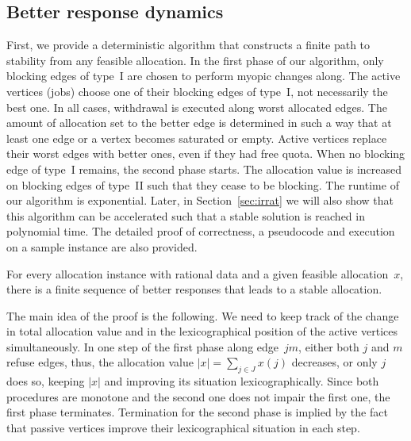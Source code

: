 \documentclass{llncs}
\begin{document}
\subsection{Better response dynamics}



First, we provide a deterministic algorithm that constructs a finite path to stability from any feasible allocation. In the first phase of our algorithm, only blocking edges of type~I are chosen to perform myopic changes along. The active vertices (jobs) choose one of their blocking edges of type~I, not necessarily the best one. In all cases, withdrawal is executed along worst allocated edges. The amount of allocation set to the better edge is determined in such a way that at least one edge or a vertex becomes saturated or empty. Active vertices replace their worst edges with better ones, even if they had free quota. When no blocking edge of type~I remains, the second phase starts. The allocation value is increased on blocking edges of type~II such that they cease to be blocking. The runtime of our algorithm is exponential. Later, in Section~\ref{sec:irrat} we will also show that this algorithm can be accelerated such that a stable solution is reached in polynomial time. The detailed proof of correctness, a pseudocode and execution on a sample instance are also provided.

\begin{theorem}
\label{th:better_rat}
For every allocation instance with rational data and a given feasible allocation~$x$, there is a finite sequence of better responses that leads to a stable allocation.
\end{theorem}

The main idea of the proof is the following. We need to keep track of the change in total allocation value and in the lexicographical position of the active vertices simultaneously. In one step of the first phase along edge~$jm$, either both $j$ and $m$ refuse edges, thus, the allocation value $|x| = \sum_{j \in J} x(j)$ decreases, or only $j$ does so, keeping $|x|$ and improving its situation lexicographically. Since both procedures are monotone and the second one does not impair the first one, the first phase terminates. Termination for the second phase is implied by the fact that passive vertices improve their lexicographical situation in each step. 
\end{document}
